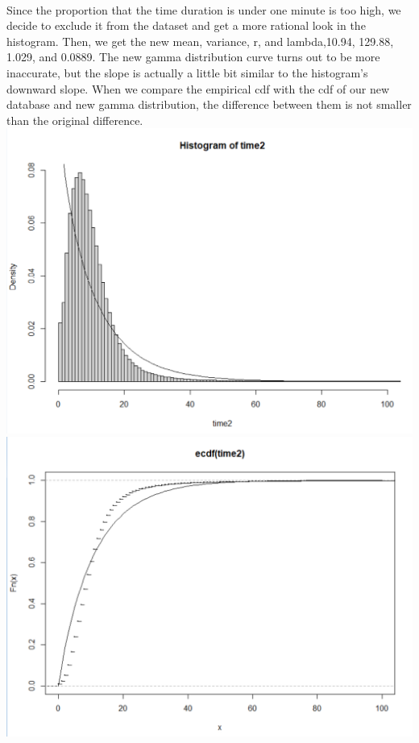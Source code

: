 \documentclass[11pt]{article}
\begin{document}
\\
\par
Since the proportion that the time duration is under one minute is too high, we decide to exclude it from the dataset
 and get a more rational look in the histogram. Then, we get the new mean, variance, r, and lambda,10.94, 129.88,
 1.029, and 0.0889. The new gamma distribution curve turns out to be more inaccurate, but the slope is actually a
 little bit similar to the histogram's downward slope. When we compare the empirical cdf with the cdf of our new
 database and new gamma distribution, the difference between them is not smaller than the original difference.\\
\includegraphics[scale = .30]{hist_p1_2.png}
\includegraphics[scale = .30]{cdf_p1_2.png}\\
\end{document}
